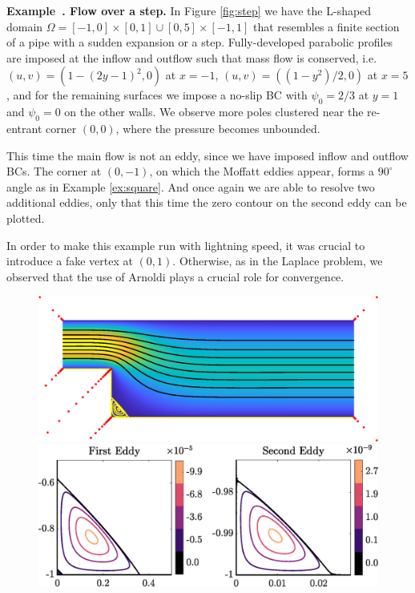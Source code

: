 \documentclass{article}
\newcounter{example}[section]
\newenvironment{example}[1][]{\refstepcounter{example}\par\medskip
	\textbf{Example~\theexample. #1} \rmfamily}{\medskip}
\begin{document}
\begin{example}[Flow over a step.]
\label{ex:step}
In Figure \ref{fig:step} we have the L-shaped domain $\Omega = [-1,0] \times
[0,1] \cup [0,5]\times[-1,1]$ that resembles a finite section of a pipe with
a sudden expansion or a step. Fully-developed parabolic profiles are imposed
at the inflow and outflow such that mass flow is conserved, i.e.
$(u,v)=(1-(2y-1)^2,0)$ at $x=-1$, $(u,v)=((1-y^2)/2,0)$ at $x=5$, and for
the remaining surfaces we impose a no-slip BC with $\psi_0=2/3$ at $y=1$ and
$\psi_0=0$ on the other walls. We observe more poles clustered near the
re-entrant corner $(0,0)$, where the pressure becomes unbounded. 

This time the main flow is not an eddy, since we have imposed inflow and
outflow BCs. The corner at $(0,-1)$, on which the Moffatt eddies appear,
forms a $90^\circ$ angle as in Example \ref{ex:square}. And once again we
are able to resolve two additional eddies, only that this time the zero
contour on the second eddy can be plotted.

In order to make this example run with lightning speed, it was crucial to
introduce a fake vertex at $(0,1)$. Otherwise, as in the Laplace problem, we
observed that the use of Arnoldi plays a crucial role for convergence.
\begin{figure}[H]
	\centering
	\includegraphics[width=\linewidth]{Figures/step}
	
	\vspace{2em}
	\includegraphics[width=\linewidth]{Figures/step_eddy}
	

\end{figure}
\end{example}
\end{document}
